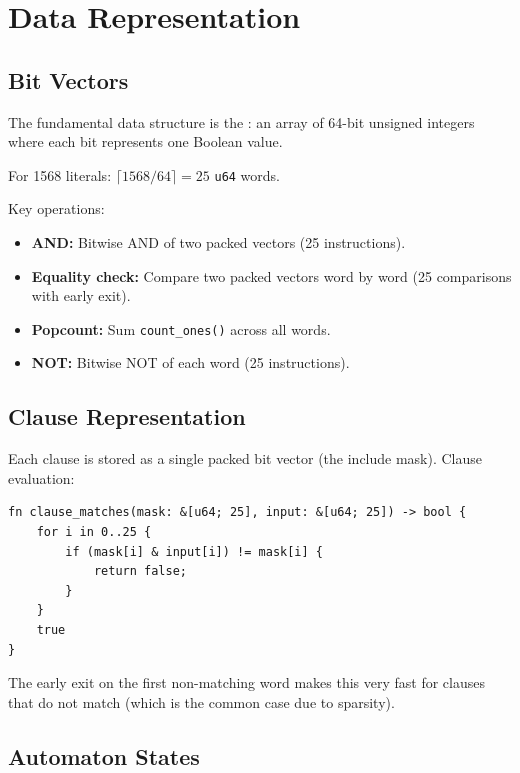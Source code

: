 \section{Data Representation}
\label{sec:data-repr}

\subsection{Bit Vectors}

The fundamental data structure is the :
an array of 64-bit unsigned integers where each bit represents one
Boolean value.

For 1568 literals: $\lceil 1568 / 64 \rceil = 25$ \texttt{u64} words.

Key operations:
\begin{itemize}
  \item \textbf{AND:} Bitwise AND of two packed vectors (25
    instructions).
  \item \textbf{Equality check:} Compare two packed vectors word by
    word (25 comparisons with early exit).
  \item \textbf{Popcount:} Sum \texttt{count\_ones()} across all
    words.
  \item \textbf{NOT:} Bitwise NOT of each word (25 instructions).
\end{itemize}

\subsection{Clause Representation}

Each clause is stored as a single packed bit vector (the include
mask). Clause evaluation:

\begin{verbatim}
fn clause_matches(mask: &[u64; 25], input: &[u64; 25]) -> bool {
    for i in 0..25 {
        if (mask[i] & input[i]) != mask[i] {
            return false;
        }
    }
    true
}
\end{verbatim}

The early exit on the first non-matching word makes this very fast
for clauses that do not match (which is the common case due to
sparsity).

\subsection{Automaton States}

